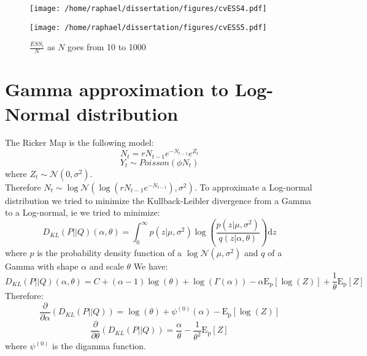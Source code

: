 \documentclass{article}
\begin{document}
\begin{figure}[htb]
	\centering
	\begin{minipage}{.45\textwidth}
		\centering
		\texttt{[image: /home/raphael/dissertation/figures/cvESS4.pdf]}
	\end{minipage}
	\begin{minipage}{.45\textwidth}
		\centering
		\texttt{[image: /home/raphael/dissertation/figures/cvESS5.pdf]}
	\end{minipage}
	\caption{$\frac{ESS_t}{N}$ as $N$ goes from 10 to 1000}
	\label{fig:conv}
\end{figure}

\section*{Gamma approximation to Log-Normal distribution}
The Ricker Map is the following model:
\begin{equation*}
N_t = rN_{t-1}e^{-N_{t-1}}e^{Z_t}
\end{equation*}
\begin{equation*}
Y_t \sim Poisson(\phi N_t)
\end{equation*}
where $Z_t \sim \mathcal{N} (0,\sigma^2)$.\\
Therefore $N_t \sim \log\mathcal{N} (\log{(rN_{t-1}e^{-N_{t-1}})},\sigma^2)$. To approximate a Log-normal distribution we tried to minimize the Kullback-Leibler divergence from a Gamma to a Log-normal, ie we tried to minimize:
\begin{equation*}
D_{KL}(P||Q)(\alpha, \theta) = \int_{0}^{\infty}{p(z|\mu, \sigma^2)\log(\frac{p(z|\mu, \sigma^2)}{q(z|\alpha, \theta)})\mathrm{d}z}
\end{equation*}
where $p$ is the probability density function of a $\log\mathcal{N}(\mu, \sigma^2)$ and $q$ of a Gamma with shape $\alpha$ and scale $\theta$
We have:
\begin{equation*}
D_{KL}(P||Q)(\alpha, \theta) = C + (\alpha-1)\log(\theta) + \log(\Gamma(\alpha)) - \alpha\mathrm{E_p}[\log(Z)] + \frac{1}{\theta}\mathrm{E_p}[Z]
\end{equation*}
Therefore:
\begin{equation*}
\frac{\partial }{\partial \alpha}(D_{KL}(P||Q)) = \log(\theta) + \psi^{(0)}(\alpha)-\mathrm{E_p}[\log(Z)]
\end{equation*}
\begin{equation*}
\frac{\partial }{\partial \theta}(D_{KL}(P||Q)) = \frac{\alpha}{\theta} - \frac{1}{\theta^2}\mathrm{E_p}[Z]
\end{equation*}
where $\psi^{(0)}$ is the digamma function.
\end{document}
